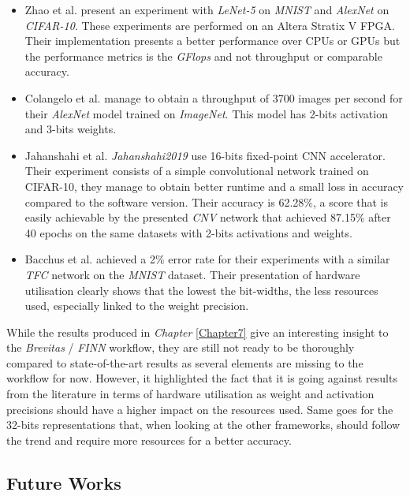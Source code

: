 \begin{itemize}
  \item Zhao et al. \cite{Zhao2016} present an experiment with \emph{LeNet-5} on \emph{MNIST} and \emph{AlexNet} on \emph{CIFAR-10}. These experiments are performed on an Altera Stratix V FPGA. Their implementation presents a better performance over CPUs or GPUs but the performance metrics is the \emph{GFlops} and not throughput or comparable accuracy.
  \item Colangelo et al. \cite{Colangelo2018} manage to obtain a throughput of 3700 images per second for their \emph{AlexNet} model trained on \emph{ImageNet}. This model has 2-bits activation and 3-bits weights.
  \item Jahanshahi et al. \emph{Jahanshahi2019} use 16-bits fixed-point CNN accelerator. Their experiment consists of a simple convolutional network trained on CIFAR-10, they manage to obtain better runtime and a small loss in accuracy compared to the software version. Their accuracy is 62.28\%, a score that is easily achievable by the presented \emph{CNV} network that achieved 87.15\% after 40 epochs on the same datasets with 2-bits activations and weights.
  \item Bacchus et al. \cite{Bacchus2020} achieved a 2\% error rate for their experiments with a similar \emph{TFC} network on the \emph{MNIST} dataset. Their presentation of hardware utilisation clearly shows that the lowest the bit-widths, the less resources used, especially linked to the weight precision.
\end{itemize}

While the results produced in \emph{Chapter} \ref{Chapter7} give an interesting insight to the \emph{Brevitas} / \emph{FINN} workflow, they are still not ready to be thoroughly compared to state-of-the-art results as several elements are missing to the workflow for now. However, it highlighted the fact that it is going against results from the literature in terms of hardware utilisation as weight and activation precisions should have a higher impact on the resources used. Same goes for the 32-bits representations that, when looking at the other frameworks, should follow the trend and require more resources for a better accuracy.


\subsection{Future Works}

